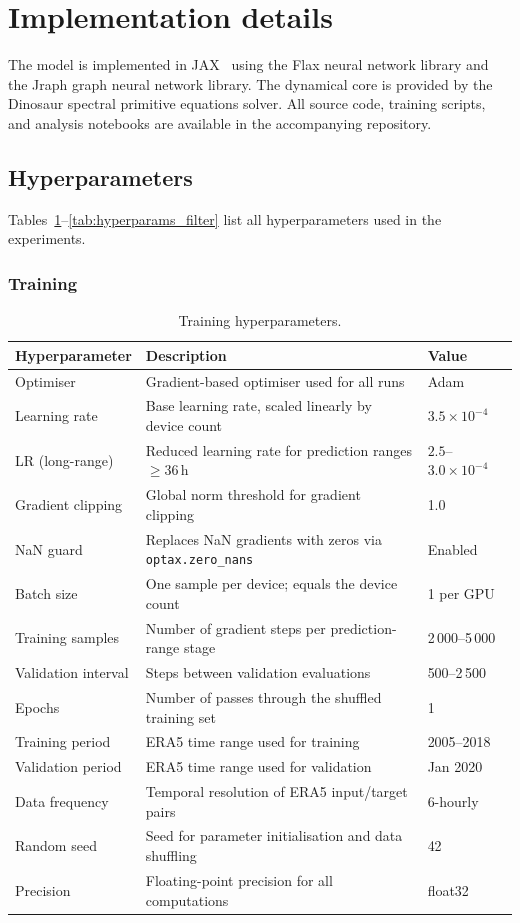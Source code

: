 \section{Implementation details}
\label{sec:implementation_details}

The model is implemented in JAX~\cite{jax} using the Flax neural network library and the Jraph graph neural network library.
The dynamical core is provided by the Dinosaur spectral primitive equations solver.
All source code, training scripts, and analysis notebooks are available in the accompanying repository.

\subsection{Hyperparameters}

Tables~\ref{tab:hyperparams_training}--\ref{tab:hyperparams_filter} list all hyperparameters used in the experiments.

\subsubsection{Training}

\begin{table}[htbp]
\centering
\small
\begin{tabular}{lp{6.4cm}l}
\hline
\textbf{Hyperparameter} & \textbf{Description} & \textbf{Value} \\
\hline\hline
Optimiser & Gradient-based optimiser used for all runs & Adam \\
Learning rate & Base learning rate, scaled linearly by device count & $3.5 \times 10^{-4}$ \\
LR (long-range) & Reduced learning rate for prediction ranges $\geq$36\,h & $2.5$--$3.0 \times 10^{-4}$ \\
Gradient clipping & Global norm threshold for gradient clipping & 1.0 \\
NaN guard & Replaces NaN gradients with zeros via \texttt{optax.zero\_nans} & Enabled \\
Batch size & One sample per device; equals the device count & 1 per GPU \\
Training samples & Number of gradient steps per prediction-range stage & 2\,000--5\,000 \\
Validation interval & Steps between validation evaluations & 500--2\,500 \\
Epochs & Number of passes through the shuffled training set & 1 \\
Training period & ERA5 time range used for training & 2005--2018 \\
Validation period & ERA5 time range used for validation & Jan 2020 \\
Data frequency & Temporal resolution of ERA5 input/target pairs & 6-hourly \\
Random seed & Seed for parameter initialisation and data shuffling & 42 \\
Precision & Floating-point precision for all computations & float32 \\
\hline
\end{tabular}
\caption{Training hyperparameters.}
\label{tab:hyperparams_training}
\end{table}


